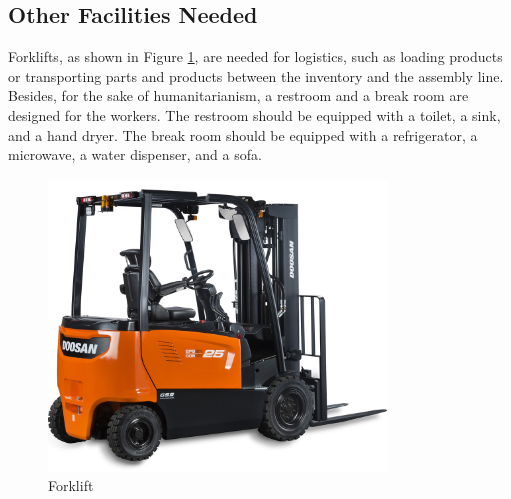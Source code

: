 \subsection{Other Facilities Needed} \label{sec:Facilities}
Forklifts, as shown in Figure \ref{fig:forklift}, are needed for logistics, such as loading products or transporting parts and products between the inventory and the assembly line. Besides, for the sake of humanitarianism, a restroom and a break room are designed for the workers. The restroom should be equipped with a toilet, a sink, and a hand dryer. The break room should be equipped with a refrigerator, a microwave, a water dispenser, and a sofa. 

\begin{figure}
    \centering
    \includegraphics[width=0.8\textwidth]{images/forklift.jpg}
    \caption{Forklift}
    \label{fig:forklift}
\end{figure}


